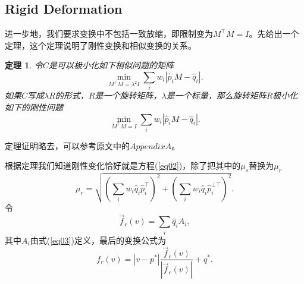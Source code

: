 \documentclass[12pt]{article}
\newtheorem{theorem}{\hspace{2em}定理}
\begin{document}
\subsection{Rigid Deformation}
进一步地，我们要求变换中不包括一致放缩，即限制变为$M^{\top}M=I$。先给出一个定理，这个定理说明了刚性变换和相似变换的关系。
\begin{theorem}
	令$C$是可以极小化如下相似问题的矩阵
	\begin{equation*}
		\min_{M^{\top}M=\lambda^2I}\sum_iw_i\left|\hat{p}_iM-\hat{q}_i\right|.
	\end{equation*}
	如果$C$写成$\lambda R$的形式，$R$是一个旋转矩阵，$\lambda$是一个标量，那么旋转矩阵$R$极小化如下的刚性问题
	\begin{equation*}
		\min_{M^{\top}M=I}\sum_iw_i\left|\hat{p}_iM-\hat{q}_i\right|.
	\end{equation*}
\end{theorem}
定理证明略去，可以参考原文中的$Appendix A$。

根据定理我们知道刚性变化恰好就是方程(\ref{eq02})，除了把其中的$\mu_s$替换为$\mu_r$
\begin{equation*}
	\mu_r = \sqrt{\left(\sum_iw_i\hat{q}_i\hat{p}_i^{\top}\right)^2 + \left(\sum_iw_i\hat{q}_i\hat{p}_i^{\bot\top}\right)^2}.
\end{equation*}
令
\begin{equation*}
	\overrightarrow{f}_r(v)=\sum_i\hat{q}_iA_i,
\end{equation*}
其中$A_i$由式(\ref{eq03})定义，最后的变换公式为
\begin{equation}
	f_r(v)  = \left|v-p^*\right|\frac{\overrightarrow{f}_r(v)}{\left|\overrightarrow{f}_r(v)\right|} + q^*.
\end{equation}
\end{document}
